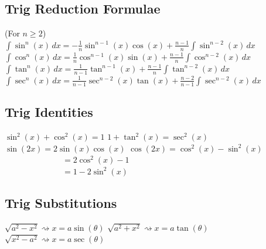 \documentclass[10pt,landscape,letterpaper]{cheatsheet}
\begin{document}
\subsection*{Trig Reduction Formulae} (For $n \geq 2$) \\
$\int \sin^n(x) \,dx = -\frac{1}{n}\sin^{n-1}(x)\cos(x)+\frac{n-1}{n}\int \sin^{n-2}(x) \,dx$\\
$\int \cos^n(x) \,dx = \frac{1}{n}\cos^{n-1}(x)\sin(x)+\frac{n-1}{n}\int \cos^{n-2}(x) \,dx$\\
$\int \tan^n(x) \,dx = \frac{1}{n-1}\tan^{n-1}(x)+\frac{n-1}{n}\int \tan^{n-2}(x) \,dx$\\
$\int \sec^n(x) \,dx = \frac{1}{n-1}\sec^{n-2}(x)\tan(x)+\frac{n-2}{n-1}\int \sec^{n-2}(x) \,dx$\\

\subsection*{Trig Identities}
$\sin^2(x)+\cos^2(x)=1$
$1+\tan^2(x)=\sec^2(x)$
$\sin(2x)=2\sin(x)\cos(x)$
$\cos(2x)=\cos^2(x)-\sin^2(x)$\\
~~~~~~~~~~~~~~$=2\cos^2(x)-1$\\
~~~~~~~~~~~~~~$=1-2\sin^2(x)$

\subsection*{Trig Substitutions}
$\sqrt{a^2-x^2} \rightsquigarrow x=a\sin(\theta)$
$\sqrt{a^2+x^2} \rightsquigarrow x=a\tan(\theta)$
$\sqrt{x^2-a^2} \rightsquigarrow x=a\sec(\theta)$


\end{document}
